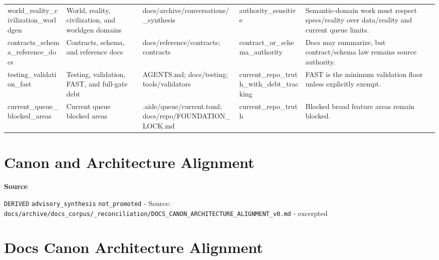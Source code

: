 \documentclass[10.5pt,a4paper,openany]{book}
\newcommand{\bottomrule}{\hline}
\newcommand{\vonecallout}[3]{\par\medskip\noindent\begingroup\setlength{\fboxsep}{7pt}\colorbox{DomCalloutBg}{\parbox{0.94\linewidth}{\textbf{\textcolor{#1}{#2}}\par #3}}\endgroup\par\medskip}
\begin{document}
\begin{center}
{\begin{tabularx}{\linewidth}{@{}>{\raggedright\arraybackslash}X >{\raggedright\arraybackslash}X >{\raggedright\arraybackslash}X >{\raggedright\arraybackslash}X >{\raggedright\arraybackslash}X@{}}
world\_\allowbreak{}reality\_\allowbreak{}civilization\_\allowbreak{}worldgen & World, reality, civilization, and worldgen domains & docs/\allowbreak{}archive/\allowbreak{}conversations/\allowbreak{}\_\allowbreak{}synthesis & authority\_\allowbreak{}sensitive & Semantic-\allowbreak{}domain work must respect specs/\allowbreak{}reality over data/\allowbreak{}reality and current queue limits.\allowbreak{} \\
contracts\_\allowbreak{}schema\_\allowbreak{}reference\_\allowbreak{}docs & Contracts, schema, and reference docs & docs/\allowbreak{}reference/\allowbreak{}contracts; contracts & contract\_\allowbreak{}or\_\allowbreak{}schema\_\allowbreak{}authority & Docs may summarize, but contract/\allowbreak{}schema law remains source authority.\allowbreak{} \\
testing\_\allowbreak{}validation\_\allowbreak{}fast & Testing, validation, FAST, and full-\allowbreak{}gate debt & AGENTS.\allowbreak{}md; docs/\allowbreak{}testing; tools/\allowbreak{}validators & current\_\allowbreak{}repo\_\allowbreak{}truth\_\allowbreak{}with\_\allowbreak{}debt\_\allowbreak{}tracking & FAST is the minimum validation floor unless explicitly exempt.\allowbreak{} \\
current\_\allowbreak{}queue\_\allowbreak{}blocked\_\allowbreak{}areas & Current queue blocked areas & .\allowbreak{}aide/\allowbreak{}queue/\allowbreak{}current.\allowbreak{}toml; docs/\allowbreak{}repo/\allowbreak{}FOUNDATION\_\allowbreak{}LOCK.\allowbreak{}md & current\_\allowbreak{}repo\_\allowbreak{}truth & Blocked broad feature areas remain blocked.\allowbreak{} \\
\bottomrule
\end{tabularx}
}
\end{center}



\section{Canon and Architecture Alignment}

\vonecallout{DomSlate}{Source}{\texttt{DERIVED} \texttt{advisory\_\allowbreak{}synthesis} \texttt{not\_\allowbreak{}promoted} -\allowbreak{} Source: \texttt{docs/\allowbreak{}archive/\allowbreak{}docs\_\allowbreak{}corpus/\allowbreak{}\_\allowbreak{}reconciliation/\allowbreak{}DOCS\_\allowbreak{}CANON\_\allowbreak{}ARCHITECTURE\_\allowbreak{}ALIGNMENT\_\allowbreak{}v0.\allowbreak{}md} -\allowbreak{} excerpted}

\section{Docs Canon Architecture Alignment}
\end{document}
